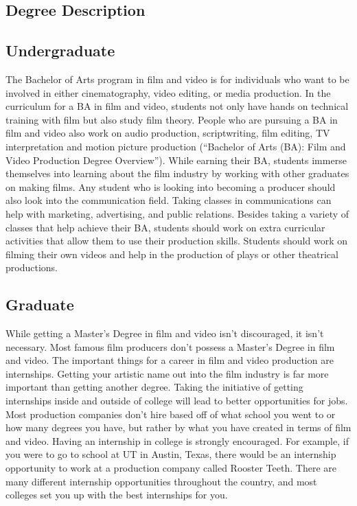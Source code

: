 \begin{multicols}{2}

\section{Degree Description}
    \subsection{Undergraduate}
		The Bachelor of Arts program in film and video is for individuals who want to be involved in either cinematography, video editing, or media production. In the curriculum for a BA in film and video, students not only have hands on technical training with film but also study film theory. People who are pursuing a BA in film and video also work on audio production, scriptwriting, film editing, TV interpretation and motion picture production (“Bachelor of Arts (BA): Film and Video Production Degree Overview”). While earning their BA, students immerse themselves into learning about the film industry by working with other graduates on making films. Any student who is looking into becoming a producer should also look into the communication field. Taking classes in communications can help with marketing, advertising, and public relations. Besides taking a variety of classes that help achieve their BA, students should work on extra curricular activities that allow them to use their production skills. Students should work on filming their own videos and help in the production of plays or other theatrical productions.
    \subsection{Graduate}
		While getting a Master’s Degree in film and video isn’t discouraged, it isn’t necessary. Most famous film producers don’t possess a Master's Degree in film and video. The important things for a career in film and video production are internships. Getting your artistic name out into the film industry is far more important than getting another degree. Taking the initiative of getting internships inside and outside of college will lead to better opportunities for jobs. Most production companies don’t hire based off of what school you went to or how many degrees you have, but rather by what you have created in terms of film and video. Having an internship in college is strongly encouraged. For example, if you were to go to school at UT in Austin, Texas, there would be an internship opportunity to work at a production company called Rooster Teeth. There are many different internship opportunities throughout the country, and most colleges set you up with the best internships for you. 


\end{multicols}
